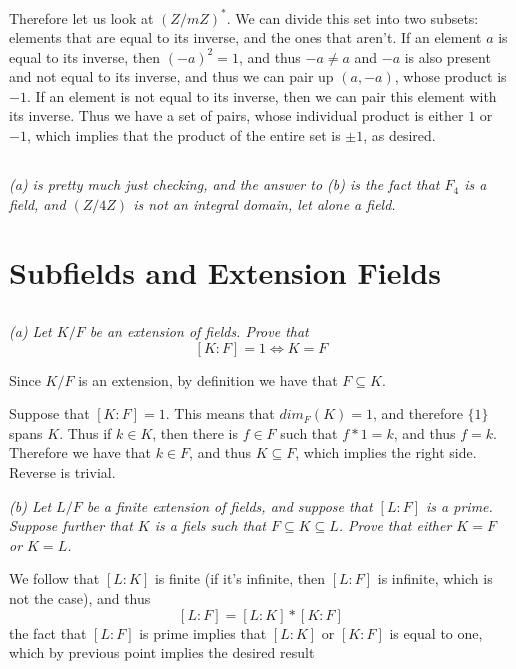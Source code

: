 \documentclass[11pt,oneside,titlepage]{book}
\DeclareMathOperator \lra {\Leftrightarrow}
\newcommand{\set}[1]{\{ #1 \}}
\begin{document}
Therefore let us look at $(Z/mZ)^*$. We can divide this set into two
subsets: elements that are equal to its inverse, and the ones that
aren't. If an element $a$ is equal to its inverse, then $(-a)^2 = 1$,
and thus $-a \neq a$ and $-a$ is also present and not equal to its
inverse, and thus we can pair up $(a, -a)$, whose product is $-1$. If
an element is not equal to its inverse, then we can pair this element
with its inverse. Thus we have a set of pairs, whose individual
product is either $1$ or $-1$, which implies that the product of the
entire set is $\pm 1$, as desired.

\subsection{}

\textit{(a) is pretty much just checking, and the answer to (b) is the
fact that $F_4$ is a field, and $(Z/4Z)$ is not an integral domain,
let alone a field.}

\section{Subfields and Extension Fields}

\subsection{}

\textit{(a) Let $K/F$ be an extension of fields. Prove that
  $$[K:F] = 1 \lra K = F$$
}

Since $K/F$ is an extension, by definition we have that $F \subseteq
K$.

Suppose that $[K:F] = 1$. This means that $dim_F(K) = 1$, and
therefore $\set{1}$ spans $K$. Thus if $k \in K$, then there is $f \in
F$ such that $f * 1 = k$, and thus $f = k$. Therefore we have that $k
\in F$, and thus $K \subseteq F$, which implies the right
side. Reverse is trivial.

\textit{(b) Let $L/F$ be a finite extension of fields, and suppose
that $[L:F]$ is a prime. Suppose further that $K$ is a fiels such that
$F \subseteq K \subseteq L$. Prove that either $K = F$ or $K = L$.}

We follow that $[L:K]$ is finite (if it's infinite, then $[L:F]$ is
infinite, which is not the case), and thus
$$[L:F] = [L:K] * [K:F]$$
the fact that $[L:F]$ is prime implies that $[L:K]$ or $[K:F]$ is
equal to one, which by previous point implies the desired result
\end{document}

